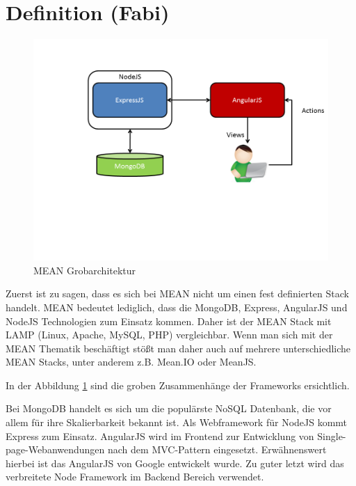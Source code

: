 \section{Definition (Fabi)}
\label{definition-fabi}

\begin{figure}[h]
	\centering
	\includegraphics[width=0.7\linewidth]{figures/mean-grobarchitektur.png}
	\caption{MEAN Grobarchitektur}
	\label{f:mean-grobarchitektur}
\end{figure}

Zuerst ist zu sagen, dass es sich bei MEAN nicht um einen fest definierten Stack handelt. MEAN bedeutet lediglich, dass die MongoDB, Express, AngularJS und NodeJS Technologien zum Einsatz kommen. Daher ist der MEAN Stack mit LAMP (Linux, Apache, MySQL, PHP) vergleichbar. Wenn man sich mit der MEAN Thematik beschäftigt stößt man daher auch auf mehrere unterschiedliche MEAN Stacks, unter anderem z.B. Mean.IO oder MeanJS.

In der Abbildung \ref{f:mean-grobarchitektur} sind die groben Zusammenhänge der Frameworks ersichtlich.

Bei MongoDB handelt es sich um die populärste NoSQL Datenbank, die vor allem für ihre Skalierbarkeit bekannt ist. Als Webframework für NodeJS kommt Express zum Einsatz. AngularJS wird im Frontend zur Entwicklung von Single-page-Webanwendungen nach dem MVC-Pattern eingesetzt. Erwähnenswert hierbei ist das AngularJS von Google entwickelt wurde. Zu guter letzt wird das verbreitete Node Framework im Backend Bereich verwendet.